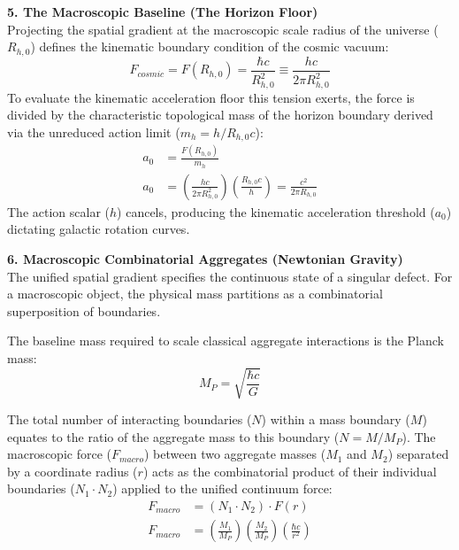 \textbf{5. The Macroscopic Baseline (The Horizon Floor)} \\
Projecting the spatial gradient at the macroscopic scale radius of the universe ($R_{h,0}$) defines the kinematic boundary condition of the cosmic vacuum:
\begin{equation}
    F_{cosmic} = F(R_{h,0}) = \frac{\hbar c}{R_{h,0}^2} \equiv \frac{h c}{2\pi R_{h,0}^2}
\end{equation}
To evaluate the kinematic acceleration floor this tension exerts, the force is divided by the characteristic topological mass of the horizon boundary derived via the unreduced action limit ($m_h = h / R_{h,0} c$): 
\begin{align}
    a_0 &= \frac{F(R_{h,0})}{m_h} \nonumber \\
    a_0 &= \left( \frac{h c}{2\pi R_{h,0}^2} \right) \left( \frac{R_{h,0} c}{h} \right) = \frac{c^2}{2\pi R_{h,0}} 
\end{align}
The action scalar ($h$) cancels, producing the kinematic acceleration threshold ($a_0$) dictating galactic rotation curves.

\vspace{0.2 cm}

\textbf{6. Macroscopic Combinatorial Aggregates (Newtonian Gravity)} \\
The unified spatial gradient specifies the continuous state of a singular defect. For a macroscopic object, the physical mass partitions as a combinatorial superposition of boundaries.

The baseline mass required to scale classical aggregate interactions is the Planck mass:
\begin{equation}
    M_P = \sqrt{\frac{\hbar c}{G}}
\end{equation}

The total number of interacting boundaries ($N$) within a mass boundary ($M$) equates to the ratio of the aggregate mass to this boundary ($N = M / M_P$). The macroscopic force ($F_{macro}$) between two aggregate masses ($M_1$ and $M_2$) separated by a coordinate radius ($r$) acts as the combinatorial product of their individual boundaries ($N_1 \cdot N_2$) applied to the unified continuum force:
\begin{align}
    F_{macro} &= (N_1 \cdot N_2) \cdot F(r) \nonumber \\
    F_{macro} &= \left( \frac{M_1}{M_P} \right) \left( \frac{M_2}{M_P} \right) \left( \frac{\hbar c}{r^2} \right)
\end{align}


